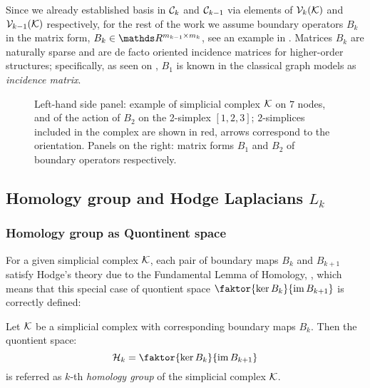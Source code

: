 Since we already established basis in \( \mathcal{C}_k \) and \( \mathcal{C}_{k-1}\) via elements of \( \mathcal{V}_{k}(\mathcal{K}) \) and \( \mathcal{V}_{k-1}(\mathcal{K}) \) respectively, for the rest of the work we assume boundary operators \( B_k \) in the matrix form, \( B_k \in \ds R^{ m_{k-1} \times m_k }\), see an example in . Matrices \( B_k \) are naturally sparse and are de facto oriented incidence matrices for higher-order structures; specifically, as seen on , \( B_1 \) is known in the classical graph models as \emph{incidence matrix}.
\begin{figure}[hbtp]
      \centering
      
      \caption{
            Left-hand side panel: example of simplicial complex $\mathcal{K}$ on $7$ nodes, and of the action of $B_2$ on the 2-simplex $[1,2,3]$; $2$-simplices included in the complex are shown in red, arrows correspond to the orientation. Panels on the right: matrix forms $B_1$ and $B_2$ of boundary operators respectively. \label{fig:bound_mat}
      }
\end{figure}



\subsection{ Homology group and Hodge Laplacians \( L_k \) }

\subsubsection{Homology group as Quontinent space}

For a given simplicial complex \( \mathcal{K} \), each pair of boundary maps \( B_k \) and \( B_{k+1 } \) satisfy Hodge's theory due to the Fundamental Lemma of Homology, , which means that this special case of quontient space \( \faktor{ \ker B_k }{ \im B_{k+1} } \) is correctly defined:

\begin{definition}
      Let \( \mathcal{K} \) be a simplicial complex with corresponding boundary maps \( B_k \). Then the quontient space:
      \begin{equation}
            \mc H_k = \faktor{ \ker B_k }{ \im B_{k+1} } 
      \end{equation}
      is referred as  \(k\)-th \emph{homology group} of the simplicial complex \( \mathcal{K} \).
\end{definition}

